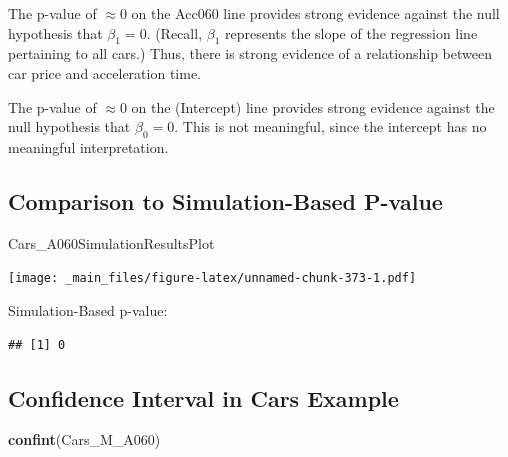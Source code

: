 \documentclass[]{book}
\newenvironment{Shaded}{\begin{snugshade}}{\end{snugshade}}
\newcommand{\KeywordTok}[1]{\textcolor[rgb]{0.13,0.29,0.53}{\textbf{#1}}}
\newcommand{\DecValTok}[1]{\textcolor[rgb]{0.00,0.00,0.81}{#1}}
\newcommand{\StringTok}[1]{\textcolor[rgb]{0.31,0.60,0.02}{#1}}
\newcommand{\OperatorTok}[1]{\textcolor[rgb]{0.81,0.36,0.00}{\textbf{#1}}}
\newcommand{\NormalTok}[1]{#1}
\begin{document}
The p-value of \(\approx 0\) on the Acc060 line provides strong evidence
against the null hypothesis that \(\beta_1=0\). (Recall, \(\beta_1\)
represents the slope of the regression line pertaining to all cars.)
Thus, there is strong evidence of a relationship between car price and
acceleration time.

The p-value of \(\approx 0\) on the (Intercept) line provides strong
evidence against the null hypothesis that \(\beta_0=0\). This is not
meaningful, since the intercept has no meaningful interpretation.

\subsection{Comparison to Simulation-Based
P-value}\label{comparison-to-simulation-based-p-value}

\begin{Shaded}
\begin{Highlighting}[]
\NormalTok{Cars_A060SimulationResultsPlot}
\end{Highlighting}
\end{Shaded}

\texttt{[image: \_main\_files/figure-latex/unnamed-chunk-373-1.pdf]}

Simulation-Based p-value:

\begin{Shaded}
\end{Shaded}

\begin{verbatim}
## [1] 0
\end{verbatim}

\subsection{Confidence Interval in Cars
Example}\label{confidence-interval-in-cars-example}

\begin{Shaded}
\begin{Highlighting}[]
\KeywordTok{confint}\NormalTok{(Cars_M_A060)}
\end{Highlighting}
\end{Shaded}
\end{document}
